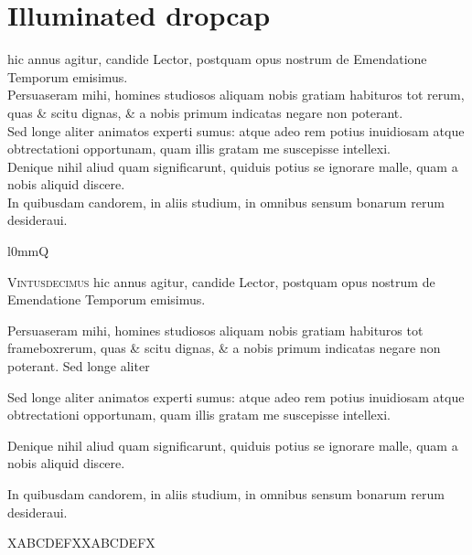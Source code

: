 \chapter{Illuminated dropcap}
\begin{parnumbers}
 hic annus agitur, candide Lector, postquam opus nostrum de Emendatione Temporum emisimus.
\\ \p
Persuaseram mihi, homines studiosos aliquam nobis gratiam habituros tot rerum, quas \& scitu dignas, \& a nobis primum indicatas negare non poterant.
\\ \p
Sed longe aliter animatos experti sumus: atque adeo rem potius inuidiosam atque obtrectationi opportunam, quam illis gratam me suscepisse intellexi.
\\ \p
Denique nihil aliud quam significarunt, quiduis potius se ignorare malle, quam a nobis aliquid discere.
\\ \p
In quibusdam candorem, in aliis studium, in omnibus sensum bonarum rerum desideraui.

\setlength{\intextsep}{-0.2ex}
\setlength{\dcunit}{1.25\baselineskip}
\setlength{\dcscale}{9\dcunit}
\addtolength{\dcscale}{-0.5\baselineskip}
\setlength{\columnsep}{1pt}\begin{wrapfigure}[9]{l}{0mm}{\initfamily\fontsize{\dcscale}{1em}\selectfont Q}\end{wrapfigure}
\textsc{Vintusdecimus} hic annus agitur, candide Lector, postquam opus nostrum de Emendatione Temporum emisimus.

Persuaseram mihi, homines studiosos aliquam nobis gratiam habituros tot framebox{rerum, quas \& scitu dignas,} \& a nobis primum indicatas negare non poterant. Sed longe aliter

Sed longe aliter animatos experti sumus: atque adeo rem potius inuidiosam atque obtrectationi opportunam, quam illis gratam me suscepisse intellexi.

Denique nihil aliud quam significarunt, quiduis potius se ignorare malle, quam a nobis aliquid discere.

In quibusdam candorem, in aliis studium, in omnibus sensum bonarum rerum desideraui.

{\initfamily XABCDEFX}XABCDEFX


\end{parnumbers}
